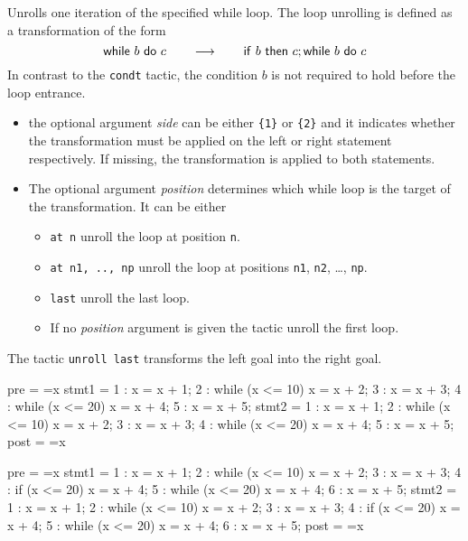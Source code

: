 \Description Unrolls one iteration of the specified while loop. 
The loop unrolling is defined as a transformation  of the form
\begin{displaymath}
\mathsf{while}\ b\ \mathsf{do}\ c \qquad\longrightarrow\qquad \mathsf{if}\ b\ \mathsf{then}\ c;\mathsf{while}\ b\ \mathsf{do}\ c
\end{displaymath}
In contrast to the \verb+condt+ tactic, the condition $b$ is not
required to hold before the loop entrance.
\begin{itemize}
  \item the optional argument \textit{side} can be either \verb+{1}+ or
  \verb+{2}+ and it indicates whether the
  transformation must be applied on the left or right
  statement respectively. 
  If missing, the transformation is applied to both statements.
  \item The optional argument \textit{position} determines which while loop is
  the target of the transformation. It can be either
  \begin{itemize}
  \item \verb+at n+ unroll the loop at position \verb+n+. 
  \item \verb+at n1, .., np+ unroll the loop at positions \verb+n1+, \verb+n2+, \ldots, \verb+np+. 
  \item \verb+last+ unroll the last loop.
  \item If no \textit{position} argument is given the tactic unroll the first loop.
\end{itemize} 
\end{itemize}

\Example The tactic \verb+unroll last+ transforms the left goal into the right goal.

\begin{minicode}{0.5}

pre   = ={x}
stmt1 =   1 : x = x + 1;
          2 : while (x <= 10) x = x + 2;
          3 : x = x + 3;
          4 : while (x <= 20) x = x + 4;
          5 : x = x + 5;
stmt2 =   1 : x = x + 1;
          2 : while (x <= 10) x = x + 2;
          3 : x = x + 3;
          4 : while (x <= 20) x = x + 4;
          5 : x = x + 5;
post  = ={x}

\end{minicode}
\begin{minicode}{0.5}

pre   = ={x}
stmt1 =   1 : x = x + 1;
          2 : while (x <= 10) x = x + 2;
          3 : x = x + 3;
          4 : if (x <= 20) x = x + 4;
          5 : while (x <= 20) x = x + 4;
          6 : x = x + 5;
stmt2 =   1 : x = x + 1;
          2 : while (x <= 10) x = x + 2;
          3 : x = x + 3;
          4 : if (x <= 20) x = x + 4;
          5 : while (x <= 20) x = x + 4;
          6 : x = x + 5;
post  = ={x}

\end{minicode}

